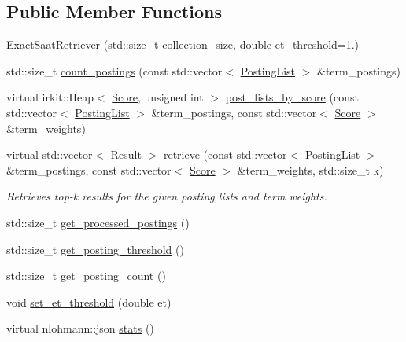 \subsection*{Public Member Functions}
\begin{DoxyCompactItemize}
\item 
\hyperlink{classbloodhound_1_1query_1_1ExactSaatRetriever_a50c5c53b4b7aff76e4eabf040219be52}{Exact\+Saat\+Retriever} (std\+::size\+\_\+t collection\+\_\+size, double et\+\_\+threshold=1.)
\item 
std\+::size\+\_\+t \hyperlink{classbloodhound_1_1query_1_1ExactSaatRetriever_a21f4192190392fee8d8b12b99c6bbe0e}{count\+\_\+postings} (const std\+::vector$<$ \hyperlink{classbloodhound_1_1PostingList}{Posting\+List} $>$ \&term\+\_\+postings)
\item 
virtual irkit\+::\+Heap$<$ \hyperlink{structbloodhound_1_1Score}{Score}, unsigned int $>$ \hyperlink{classbloodhound_1_1query_1_1ExactSaatRetriever_a180277ad96862e92c102066586edc74f}{post\+\_\+lists\+\_\+by\+\_\+score} (const std\+::vector$<$ \hyperlink{classbloodhound_1_1PostingList}{Posting\+List} $>$ \&term\+\_\+postings, const std\+::vector$<$ \hyperlink{structbloodhound_1_1Score}{Score} $>$ \&term\+\_\+weights)
\item 
virtual std\+::vector$<$ \hyperlink{structbloodhound_1_1query_1_1Result}{Result} $>$ \hyperlink{classbloodhound_1_1query_1_1ExactSaatRetriever_aced2763cc2a4c12838fef4a20759049e}{retrieve} (const std\+::vector$<$ \hyperlink{classbloodhound_1_1PostingList}{Posting\+List} $>$ \&term\+\_\+postings, const std\+::vector$<$ \hyperlink{structbloodhound_1_1Score}{Score} $>$ \&term\+\_\+weights, std\+::size\+\_\+t k)
\begin{DoxyCompactList}\small\item\em Retrieves top-\/k results for the given posting lists and term weights. \end{DoxyCompactList}\item 
std\+::size\+\_\+t \hyperlink{classbloodhound_1_1query_1_1ExactSaatRetriever_a1cf3c5e50a72880e1eb8d995ff22b20a}{get\+\_\+processed\+\_\+postings} ()
\item 
std\+::size\+\_\+t \hyperlink{classbloodhound_1_1query_1_1ExactSaatRetriever_a5d3a882f8f117130a4be46e711397e3c}{get\+\_\+posting\+\_\+threshold} ()
\item 
std\+::size\+\_\+t \hyperlink{classbloodhound_1_1query_1_1ExactSaatRetriever_a43b6bd8cdc3a64c5eabf778230c53419}{get\+\_\+posting\+\_\+count} ()
\item 
void \hyperlink{classbloodhound_1_1query_1_1ExactSaatRetriever_a78016cfffe921ed440dec62c6f82f4cc}{set\+\_\+et\+\_\+threshold} (double et)
\item 
virtual nlohmann\+::json \hyperlink{classbloodhound_1_1query_1_1ExactSaatRetriever_a716838f463f124964e76f48bc37d32cc}{stats} ()
\end{DoxyCompactItemize}
